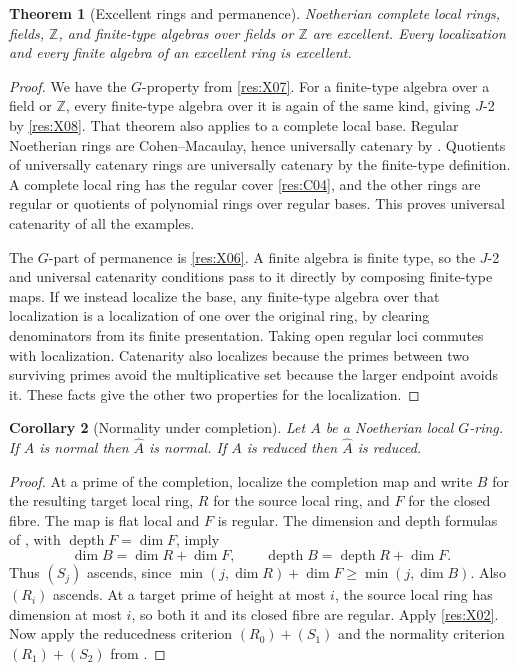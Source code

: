\documentclass[11pt,oneside,openany]{book}
\newtheorem{theorem}{Theorem}[chapter]
\newtheorem{corollary}[theorem]{Corollary}
\theoremstyle{definition}
\theoremstyle{remark}
\begin{document}
\begin{theorem}[Excellent rings and permanence]\label{res:X09}
Noetherian complete local rings, fields, \(\mathbb Z\), and finite-type algebras over fields or \(\mathbb Z\) are excellent. Every localization and every finite algebra of an excellent ring is excellent.
\end{theorem}
\begin{proof}
We have the \(G\)-property from \ref{res:X07}. For a finite-type algebra over a field or \(\mathbb Z\), every finite-type algebra over it is again of the same kind, giving \(J\)-2 by \ref{res:X08}. That theorem also applies to a complete local base. Regular Noetherian rings are Cohen--Macaulay, hence universally catenary by \cite[CM-08, CM-15]{core}. Quotients of universally catenary rings are universally catenary by the finite-type definition. A complete local ring has the regular cover \ref{res:C04}, and the other rings are regular or quotients of polynomial rings over regular bases. This proves universal catenarity of all the examples.

The \(G\)-part of permanence is \ref{res:X06}. A finite algebra is finite type, so the \(J\)-2 and universal catenarity conditions pass to it directly by composing finite-type maps. If we instead localize the base, any finite-type algebra over that localization is a localization of one over the original ring, by clearing denominators from its finite presentation. Taking open regular loci commutes with localization. Catenarity also localizes because the primes between two surviving primes avoid the multiplicative set because the larger endpoint avoids it. These facts give the other two properties for the localization.
\end{proof}

\begin{corollary}[Normality under completion]\label{res:X10}
Let \(A\) be a Noetherian local \(G\)-ring. If \(A\) is normal then \(\widehat A\) is normal. If \(A\) is reduced then \(\widehat A\) is reduced.
\end{corollary}
\begin{proof}
At a prime of the completion, localize the completion map and write \(B\) for the resulting target local ring, \(R\) for the source local ring, and \(F\) for the closed fibre. The map is flat local and \(F\) is regular. The dimension and depth formulas of \cite[CM-10]{core}, with \(\operatorname{depth}F=\dim F\), imply
\[
 \dim B=\dim R+\dim F,\qquad
 \operatorname{depth}B=\operatorname{depth}R+\dim F .
\]
Thus \((S_j)\) ascends, since \(\min(j,\dim R)+\dim F\geq\min(j,\dim B)\). Also \((R_i)\) ascends. At a target prime of height at most \(i\), the source local ring has dimension at most \(i\), so both it and its closed fibre are regular. Apply \ref{res:X02}. Now apply the reducedness criterion \((R_0)+(S_1)\) and the normality criterion \((R_1)+(S_2)\) from \cite[SN-03 and SN-09]{core}.
\end{proof}
\end{document}
